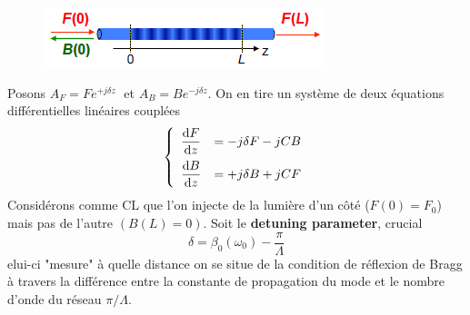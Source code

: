 	\begin{figure}
	\vspace{-8mm}
	\includegraphics[scale=0.6]{ch3/image11}
	\end{figure}
Posons ${A_F} = F{e^{ + j\delta z}}\;$ et ${A_B} = B{e^{ - j\delta z}}$. On en tire un système 
de deux équations différentielles linéaires couplées
\begin{equation}
\left\{\begin{array}{ll}
\dfrac{{{\rm{d}}F}}{{{\rm{d}}z}} &\DS=  - j\delta F - jCB\vspace{2mm}\\
\dfrac{{{\rm{d}}B}}{{{\rm{d}}z}} &\DS=  + j\delta B + jCF
\end{array}\right.
\end{equation}
Considérons comme CL que l'on injecte de la lumière d'un côté ($F(0)=F_0$) mais pas de l'autre 
$(B(L)=0)$. Soit le \textbf{detuning parameter}, crucial
\begin{equation}
\delta  = {\beta _0}({\omega _0}) - \frac{\pi }{\Lambda }
\end{equation}
elui-ci "mesure" à quelle distance on se situe de la condition de réflexion de Bragg à travers la différence entre la constante de propagation du mode et le nombre d'onde du réseau $\pi/\Lambda$.\\

